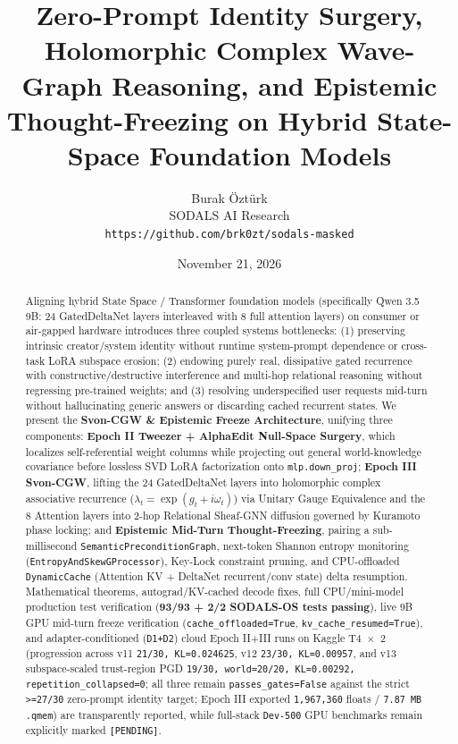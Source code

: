 \documentclass[11pt,a4paper]{article}
\title{\textbf{Zero-Prompt Identity Surgery, Holomorphic Complex Wave-Graph Reasoning, and Epistemic Thought-Freezing on Hybrid State-Space Foundation Models}}
\author{
Burak \"Ozt\"urk \\
SODALS AI Research \\
\texttt{https://github.com/brk0zt/sodals-masked}
}
\date{November 21, 2026}
\begin{document}
\maketitle

\begin{abstract}
Aligning hybrid State Space / Transformer foundation models (specifically Qwen 3.5 9B: 24 GatedDeltaNet layers interleaved with 8 full attention layers) on consumer or air-gapped hardware introduces three coupled systems bottlenecks: (1) preserving intrinsic creator/system identity without runtime system-prompt dependence or cross-task LoRA subspace erosion; (2) endowing purely real, dissipative gated recurrence with constructive/destructive interference and multi-hop relational reasoning without regressing pre-trained weights; and (3) resolving underspecified user requests mid-turn without hallucinating generic answers or discarding cached recurrent states. We present the \textbf{Svon-CGW \& Epistemic Freeze Architecture}, unifying three components: \textbf{Epoch II Tweezer + AlphaEdit Null-Space Surgery}, which localizes self-referential weight columns while projecting out general world-knowledge covariance before lossless SVD LoRA factorization onto \texttt{mlp.down\_proj}; \textbf{Epoch III Svon-CGW}, lifting the 24 GatedDeltaNet layers into holomorphic complex associative recurrence ($\lambda_t = \exp(g_t + i\omega_t)$) via Unitary Gauge Equivalence and the 8 Attention layers into 2-hop Relational Sheaf-GNN diffusion governed by Kuramoto phase locking; and \textbf{Epistemic Mid-Turn Thought-Freezing}, pairing a sub-millisecond \texttt{SemanticPreconditionGraph}, next-token Shannon entropy monitoring (\texttt{EntropyAndSkewGProcessor}), Key-Lock constraint pruning, and CPU-offloaded \texttt{DynamicCache} (Attention KV + DeltaNet recurrent/conv state) delta resumption. Mathematical theorems, autograd/KV-cached decode fixes, full CPU/mini-model production test verification (\textbf{93/93 + 2/2 SODALS-OS tests passing}), live 9B GPU mid-turn freeze verification (\texttt{cache\_offloaded=True}, \texttt{kv\_cache\_resumed=True}), and adapter-conditioned (\texttt{D1+D2}) cloud Epoch II+III runs on Kaggle T4~$\times$~2 (progression across v11 \texttt{21/30, KL=0.024625}, v12 \texttt{23/30, KL=0.00957}, and v13 subspace-scaled trust-region PGD \texttt{19/30, world=20/20, KL=0.00292, repetition\_collapsed=0}; all three remain \texttt{passes\_gates=False} against the strict \texttt{>=27/30} zero-prompt identity target; Epoch III exported \texttt{1,967,360} floats / \texttt{7.87 MB} \texttt{.qmem}) are transparently reported, while full-stack \texttt{Dev-500} GPU benchmarks remain explicitly marked \texttt{[PENDING]}.
\end{abstract}
\end{document}
